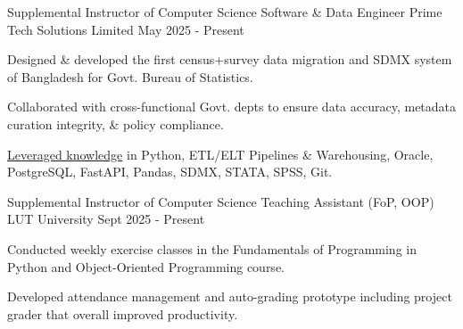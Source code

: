

\begin{cventries}

  \vspace{-0.3mm}
\cventryalt
    {Supplemental Instructor of Computer Science} %
    {Software \& Data Engineer} %
    {Prime Tech Solutions Limited} %
    {May 2025 - Present} %
    {
      \begin{cvitems}
      \item { Designed \& developed the first census+survey data migration and SDMX system of Bangladesh for Govt. Bureau of Statistics.}
      \item { Collaborated with cross-functional Govt. depts to ensure data accuracy, metadata curation integrity, \& policy compliance.}
      \item {\underline{Leveraged knowledge} in Python, ETL/ELT Pipelines \& Warehousing, Oracle, PostgreSQL, FastAPI, Pandas, SDMX, STATA, SPSS, Git.}
      \end{cvitems}
    }

    \vspace{-1.0mm}

\cventryalt
    {Supplemental Instructor of Computer Science} %
    {Teaching Assistant (FoP, OOP)} %
    {LUT University} %
    {Sept 2025 - Present} %
    {
      \begin{cvitems}
      \item { Conducted weekly exercise classes in the Fundamentals of Programming in Python and Object-Oriented Programming course.}
      \item { Developed attendance management and auto-grading prototype including project grader that overall improved productivity. }
      \end{cvitems}
    }

    \vspace{-1.0mm}
    

\end{cventries}
